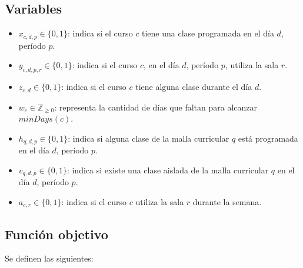 \documentclass[letter, 10pt]{article}
\begin{document}
\subsection{Variables}

\begin{itemize}
    \item $x_{c,d,p} \in \{0,1\}$: indica si el curso $c$ tiene una clase programada en el d\'ia $d$, per\'iodo $p$.
    \item $y_{c,d,p,r} \in \{0,1\}$: indica si el curso $c$, en el d\'ia $d$, per\'iodo $p$, utiliza la sala $r$.
    \item $z_{c,d} \in \{0,1\}$: indica si el curso $c$ tiene alguna clase durante el d\'ia $d$.
    \item $w_c \in \mathbb{Z}_{\geq 0}$: representa la cantidad de d\'ias que faltan para alcanzar $minDays(c)$.
    \item $h_{q,d,p} \in \{0,1\}$: indica si alguna clase de la malla curricular $q$ est\'a programada en el d\'ia $d$, per\'iodo $p$.
    \item $v_{q,d,p} \in \{0,1\}$: indica si existe una clase aislada de la malla curricular $q$ en el d\'ia $d$, per\'iodo $p$.
    \item $a_{c,r} \in \{0,1\}$: indica si el curso $c$ utiliza la sala $r$ durante la semana.
\end{itemize}



\subsection{Funci\'on objetivo}
Se definen las siguientes:
\end{document}
